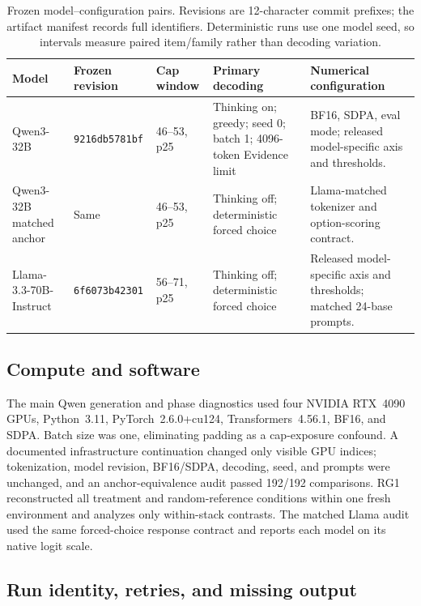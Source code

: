 \documentclass[letterpaper]{article}
\begin{document}
\begin{table}[t]
\centering
\small
\renewcommand{\arraystretch}{1.12}
\begin{tabularx}{\textwidth}{@{}L{2.25cm}L{2.15cm}L{1.75cm}L{3.15cm}Y@{}}
\toprule
Model & Frozen revision & Cap window & Primary decoding & Numerical configuration \\
\midrule
Qwen3-32B & \texttt{9216db5781bf} & 46--53, p25 & Thinking on; greedy; seed 0; batch 1; 4096-token Evidence limit & BF16, SDPA, eval mode; released model-specific axis and thresholds. \\
Qwen3-32B matched anchor & Same & 46--53, p25 & Thinking off; deterministic forced choice & Llama-matched tokenizer and option-scoring contract. \\
Llama-3.3-70B-Instruct & \texttt{6f6073b42301} & 56--71, p25 & Thinking off; deterministic forced choice & Released model-specific axis and thresholds; matched 24-base prompts. \\
\bottomrule
\end{tabularx}
\caption{Frozen model--configuration pairs. Revisions are 12-character commit prefixes; the artifact manifest records full identifiers. Deterministic runs use one model seed, so intervals measure paired item/family rather than decoding variation.}
\label{tab:supp-models}
\end{table}

\subsection{Compute and software}

The main Qwen generation and phase diagnostics used four NVIDIA RTX~4090 GPUs, Python~3.11, PyTorch~2.6.0+cu124, Transformers~4.56.1, BF16, and SDPA.  Batch size was one, eliminating padding as a cap-exposure confound.  A documented infrastructure continuation changed only visible GPU indices; tokenization, model revision, BF16/SDPA, decoding, seed, and prompts were unchanged, and an anchor-equivalence audit passed 192/192 comparisons.  RG1 reconstructed all treatment and random-reference conditions within one fresh environment and analyzes only within-stack contrasts.  The matched Llama audit used the same forced-choice response contract and reports each model on its native logit scale.

\subsection{Run identity, retries, and missing output}
\end{document}
